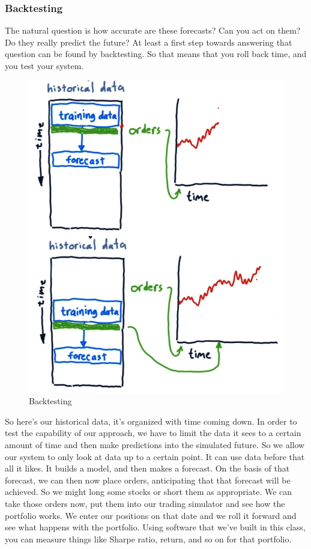 \documentclass[12pt]{article}
\begin{document}
\subsubsection{Backtesting}

The natural question is how accurate are these forecasts? Can you act on them? Do they really predict the future? At least a first step towards answering that question can be found by backtesting. So that means that you roll back time, and you test your system. 

\begin{figure}[!ht]
\centering
\includegraphics[scale=0.45]{fig/fig77}
\caption{Backtesting}
\end{figure}

So here's our historical data, it's organized with time coming down. In order to test the capability of our approach, we have to limit the data it sees to a certain amount of time and then make predictions into the simulated future. So we allow our system to only look at data up to a certain point. It can use data before that all it likes. It builds a model, and then makes a forecast. On the basis of that forecast, we can then now place orders, anticipating that that forecast will be achieved. So we might long some stocks or short them as appropriate. We can take those orders now, put them into our trading simulator and see how the portfolio works. We enter our positions on that date and we roll it forward and see what happens with the portfolio. Using software that we've built in this class, you can measure things like Sharpe ratio, return, and so on for that portfolio. 
\end{document}
